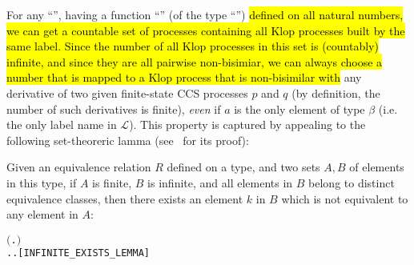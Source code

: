 For any ``'', having a function ``'' (of the type ``'')
\hl{defined on all natural numbers, we can get a countable set of processes
containing all Klop processes built by the same label.
Since the number of all Klop processes in this set is (countably) infinite, and
since they are all pairwise non-bisimiar,
we can always
choose a number that is mapped to a Klop process
that is non-bisimilar with} any derivative of two given 
 finite-state CCS processes $p$ and $q$
(by definition, the number of such derivatives is finite), \emph{even}
if $a$ is the only element of type $\beta$ (i.e. the only label name
in $\mathscr{L}$).
This property is captured by appealing to the following set-theoreric
lamma (see~\cite{Tian:2017wrba} for its proof):
\begin{lemma}
Given an equivalence relation $R$ defined on a type, and two sets $A, B$
of elements in this type, 
if $A$ is finite, $B$ is infinite, and all elements
in $B$ belong to distinct equivalence classes, then there exists an element $k$ in $B$
which is not equivalent to any element in $A$:
\begin{alltt}
\HOLTokenTurnstile{}   \HOLSymConst{\HOLTokenImp{}}
     \HOLSymConst{\HOLTokenConj{}}   \HOLSymConst{\HOLTokenConj{}} \ensuremath{(}\HOLSymConst{\HOLTokenForall{}} .  \HOLSymConst{\HOLTokenIn{}}  \HOLSymConst{\HOLTokenConj{}}  \HOLSymConst{\HOLTokenIn{}}  \HOLSymConst{\HOLTokenConj{}}  \HOLSymConst{\HOLTokenNotEqual{}}  \HOLSymConst{\HOLTokenImp{}} \HOLSymConst{\HOLTokenNeg{}}  \ensuremath{)} \HOLSymConst{\HOLTokenImp{}}
   \HOLSymConst{\HOLTokenExists{}}.  \HOLSymConst{\HOLTokenIn{}}  \HOLSymConst{\HOLTokenConj{}} \HOLSymConst{\HOLTokenForall{}}.  \HOLSymConst{\HOLTokenIn{}}  \HOLSymConst{\HOLTokenImp{}} \HOLSymConst{\HOLTokenNeg{}}  \hfill[INFINITE_EXISTS_LEMMA]
\end{alltt}
\end{lemma}

